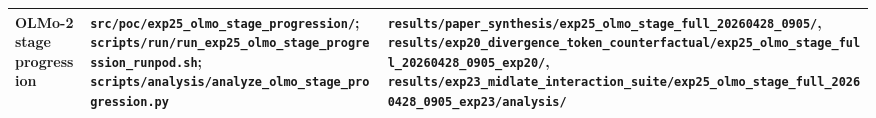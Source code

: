 \documentclass[11pt]{article}
\begin{document}
\begin{table}[t]
\begin{tabularx}{\linewidth}{@{}>{\raggedright\arraybackslash}X >{\raggedright\arraybackslash}X >{\raggedright\arraybackslash}X@{}}
OLMo-2 stage progression & \texttt{src/poc/exp25\_olmo\_stage\_progression/}; \texttt{scripts/run/run\_exp25\_olmo\_stage\_progression\_runpod.sh}; \texttt{scripts/analysis/analyze\_olmo\_stage\_progression.py} & \texttt{results/paper\_synthesis/exp25\_olmo\_stage\_full\_20260428\_0905/}, \texttt{results/exp20\_divergence\_token\_counterfactual/exp25\_olmo\_stage\_full\_20260428\_0905\_exp20/}, \texttt{results/exp23\_midlate\_interaction\_suite/exp25\_olmo\_stage\_full\_20260428\_0905\_exp23/analysis/} \\
\bottomrule
\end{tabularx}
\end{table}
\end{document}
